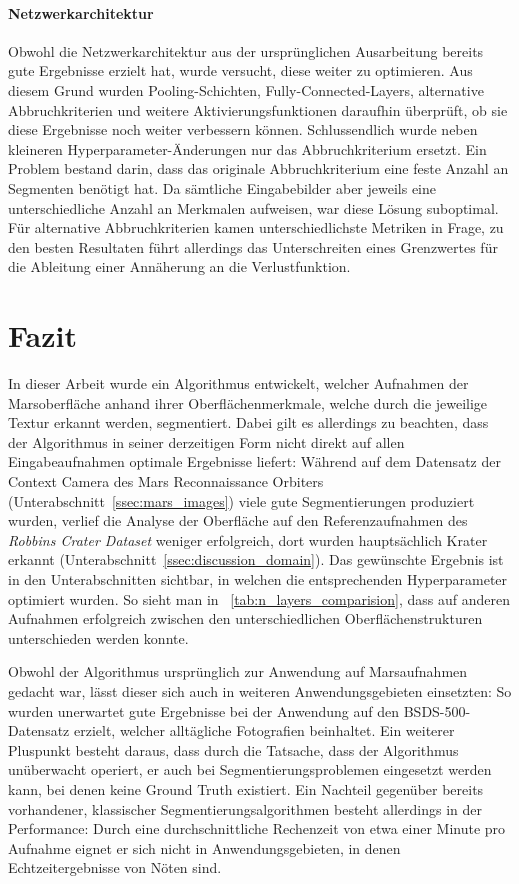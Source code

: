 \paragraph{Netzwerkarchitektur} Obwohl die Netzwerkarchitektur aus der ursprünglichen Ausarbeitung \cite{kanezaki_18} bereits gute Ergebnisse erzielt hat, wurde versucht, diese weiter zu optimieren. Aus diesem Grund wurden Pooling-Schichten, Fully-Connected-Layers, alternative Abbruchkriterien und weitere Aktivierungsfunktionen daraufhin überprüft, ob sie diese Ergebnisse noch weiter verbessern können. Schlussendlich wurde neben kleineren Hyperparameter-Änderungen nur das Abbruchkriterium ersetzt. Ein Problem bestand darin, dass das originale Abbruchkriterium eine feste Anzahl an Segmenten benötigt hat. Da sämtliche Eingabebilder aber jeweils eine unterschiedliche Anzahl an Merkmalen aufweisen, war diese Lösung suboptimal. Für alternative Abbruchkriterien kamen unterschiedlichste Metriken in Frage, zu den besten Resultaten führt allerdings das Unterschreiten eines Grenzwertes für die Ableitung einer Annäherung an die Verlustfunktion.

\section{Fazit}

In dieser Arbeit wurde ein Algorithmus entwickelt, welcher Aufnahmen der Marsoberfläche anhand ihrer Oberflächenmerkmale, welche durch die jeweilige Textur erkannt werden, segmentiert. Dabei gilt es allerdings zu beachten, dass der Algorithmus in seiner derzeitigen Form nicht direkt auf allen Eingabeaufnahmen optimale Ergebnisse liefert: Während auf dem Datensatz der Context Camera des Mars Reconnaissance Orbiters (\vgl Unterabschnitt~\ref{ssec:mars_images}) viele gute Segmentierungen produziert wurden, verlief die Analyse der Oberfläche auf den Referenzaufnahmen des \textit{Robbins Crater Dataset} \cite{robbins_12} weniger erfolgreich, dort wurden hauptsächlich Krater erkannt (\vgl Unterabschnitt~\ref{ssec:discussion_domain}). Das gewünschte Ergebnis ist in den Unterabschnitten sichtbar, in welchen die entsprechenden Hyperparameter optimiert wurden. So sieht man \bspw in \tablename~\ref{tab:n_layers_comparision}, dass auf anderen Aufnahmen erfolgreich zwischen den unterschiedlichen Oberflächenstrukturen unterschieden werden konnte.

Obwohl der Algorithmus ursprünglich zur Anwendung auf Marsaufnahmen gedacht war, lässt dieser sich auch in weiteren Anwendungsgebieten einsetzten: So wurden \bspw unerwartet gute Ergebnisse bei der Anwendung auf den BSDS-500-Datensatz \cite{bsd500} erzielt, welcher alltägliche Fotografien beinhaltet. Ein weiterer Pluspunkt besteht daraus, dass durch die Tatsache, dass der Algorithmus unüberwacht operiert, er auch bei Segmentierungsproblemen eingesetzt werden kann, bei denen keine Ground Truth existiert. Ein Nachteil gegenüber bereits vorhandener, klassischer Segmentierungsalgorithmen besteht allerdings in der Performance: Durch eine durchschnittliche Rechenzeit von etwa einer Minute pro Aufnahme eignet er sich nicht in Anwendungsgebieten, in denen Echtzeitergebnisse von Nöten sind.

